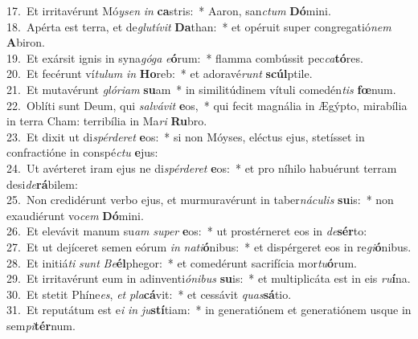 {17.~}Et irritavérunt Mó\textit{y}\textit{sen} \textit{in} \textbf{ca}stris:~* Aaron, san\textit{ctum} \textbf{Dó}mini.\\
{18.~}Apérta est terra, et de\textit{glu}\textit{tí}\textit{vit} \textbf{Da}than:~* et opéruit super congregatió\textit{nem} \textbf{A}biron.\\
{19.~}Et exársit ignis in syna\textit{gó}\textit{ga} \textit{e}\textbf{ó}rum:~* flamma combússit pec\textit{ca}\textbf{tó}res.\\
{20.~}Et fecérunt ví\textit{tu}\textit{lum} \textit{in} \textbf{Ho}reb:~* et adoravé\textit{runt} \textbf{scúl}ptile.\\
{21.~}Et mutavérunt \textit{gló}\textit{ri}\textit{am} \textbf{su}am~* in similitúdinem vítuli comedén\textit{tis} \textbf{fœ}num.\\
{22.~}Oblíti sunt Deum, qui \textit{sal}\textit{vá}\textit{vit} \textbf{e}os,~* qui fecit magnália in Ægýpto, mirabília in terra Cham: terribília in Ma\textit{ri} \textbf{Ru}bro.\\
{23.~}Et dixit ut di\textit{spér}\textit{de}\textit{ret} \textbf{e}os:~* si non Móyses, eléctus ejus, stetísset in confractióne in conspé\textit{ctu} \textbf{e}jus:\\
{24.~}Ut avérteret iram ejus ne di\textit{spér}\textit{de}\textit{ret} \textbf{e}os:~* et pro níhilo habuérunt terram desi\textit{de}\textbf{rá}bilem:\\
{25.~}Non credidérunt verbo ejus, et murmuravérunt in taber\textit{ná}\textit{cu}\textit{lis} \textbf{su}is:~* non exaudiérunt vo\textit{cem} \textbf{Dó}mini.\\
{26.~}Et elevávit manum su\textit{am} \textit{su}\textit{per} \textbf{e}os:~* ut prostérneret eos in \textit{de}\textbf{sér}to:\\
{27.~}Et ut dejíceret semen eórum \textit{in} \textit{na}\textit{ti}\textbf{ó}nibus:~* et dispérgeret eos in re\textit{gi}\textbf{ó}nibus.\\
{28.~}Et initiá\textit{ti} \textit{sunt} \textit{Be}\textbf{él}phegor:~* et comedérunt sacrifícia mor\textit{tu}\textbf{ó}rum.\\
{29.~}Et irritavérunt eum in adinventi\textit{ó}\textit{ni}\textit{bus} \textbf{su}is:~* et multiplicáta est in eis \textit{ru}\textbf{í}na.\\
{30.~}Et stetit Phíne\textit{es}, \textit{et} \textit{pla}\textbf{cá}vit:~* et cessávit \textit{quas}\textbf{sá}tio.\\
{31.~}Et reputátum est e\textit{i} \textit{in} \textit{ju}\textbf{stí}tiam:~* in generatiónem et generatiónem usque in sem\textit{pi}\textbf{tér}num.\\

